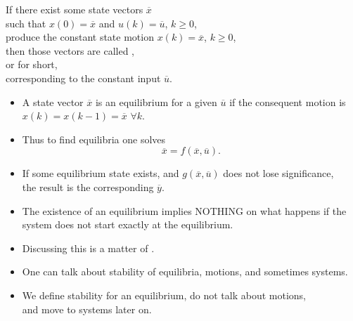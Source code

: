 \begin{frame}
\myPause
\begin{center}
 {\Large
 If there exist some state vectors $\overline{x}$\\ \myPause
 such that $x(0)=\overline{x}$ and $u(k)=\overline{u}$, $k \geq 0$,\\ \myPause
 produce the constant state motion $x(k)=\overline{x}$, $k \geq 0$,\\ \myPause
 then those vectors are called ,\\ \myPause
 or  for short,\\ \myPause
 \vspace{1.5mm}corresponding to the constant input $\overline{u}$.
 }
\end{center}
\end{frame}


\begin{frame}
\myPause
\begin{itemize}[<+-| alert@+>]
\item A state vector $\overline{x}$ is an equilibrium for a given $\overline{u}$ if the consequent motion is
      $x(k)=x(k-1)=\overline{x}$ $\forall k$.
\item Thus to find equilibria one solves
      \begin{displaymath}
       \overline{x} = f(\overline{x},\overline{u}).
      \end{displaymath}
\item If some equilibrium state exists, and $g(\overline{x},\overline{u})$ does not lose significance,\\
      the result is the corresponding  $\overline{y}$.
\end{itemize}
\end{frame}

\begin{frame}
\myPause
\begin{itemize}[<+-| alert@+>]
\item The existence of an equilibrium implies NOTHING on what happens if the system does not start exactly
      at the equilibrium.
\item Discussing this is a matter of .
\item One can talk about stability of equilibria, motions, and sometimes systems.
\item We define stability for an equilibrium, do not talk about motions,\\
      and move to systems later on.
\end{itemize}
\end{frame}

